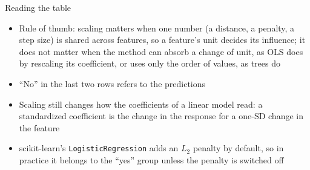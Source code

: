 \begin{frame}{Reading the table}
    \begin{itemize}
        \item Rule of thumb: scaling matters when one number (a distance, a penalty, a step size) is shared across features, so a feature's unit decides its influence; it does not matter when the method can absorb a change of unit, as OLS does by rescaling its coefficient, or uses only the order of values, as trees do
        \item ``No'' in the last two rows refers to the predictions
        \item Scaling still changes how the coefficients of a linear model read: a standardized coefficient is the change in the response for a one-SD change in the feature
        \item scikit-learn's \texttt{LogisticRegression} adds an $L_2$ penalty by default, so in practice it belongs to the ``yes'' group unless the penalty is switched off
    \end{itemize}
\end{frame}

